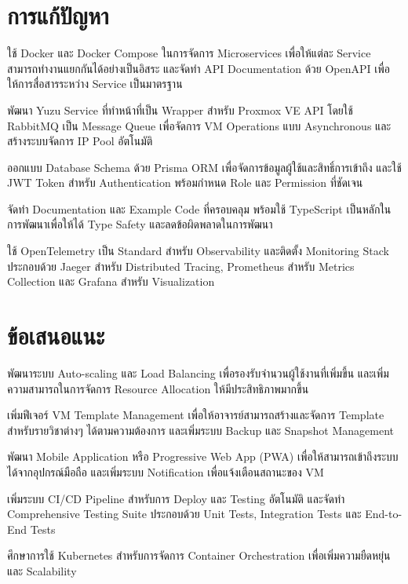 \section{การแก้ปัญหา}
\begin{mycustomenum}[label=5.3.\arabic*] 
    \item ใช้ Docker และ Docker Compose ในการจัดการ Microservices เพื่อให้แต่ละ Service สามารถทำงานแยกกันได้อย่างเป็นอิสระ และจัดทำ API Documentation ด้วย OpenAPI เพื่อให้การสื่อสารระหว่าง Service เป็นมาตรฐาน
    \item พัฒนา Yuzu Service ที่ทำหน้าที่เป็น Wrapper สำหรับ Proxmox VE API โดยใช้ RabbitMQ เป็น Message Queue เพื่อจัดการ VM Operations แบบ Asynchronous และสร้างระบบจัดการ IP Pool อัตโนมัติ
    \item ออกแบบ Database Schema ด้วย Prisma ORM เพื่อจัดการข้อมูลผู้ใช้และสิทธิ์การเข้าถึง และใช้ JWT Token สำหรับ Authentication พร้อมกำหนด Role และ Permission ที่ชัดเจน
    \item จัดทำ Documentation และ Example Code ที่ครอบคลุม พร้อมใช้ TypeScript เป็นหลักในการพัฒนาเพื่อให้ได้ Type Safety และลดข้อผิดพลาดในการพัฒนา
    \item ใช้ OpenTelemetry เป็น Standard สำหรับ Observability และติดตั้ง Monitoring Stack ประกอบด้วย Jaeger สำหรับ Distributed Tracing, Prometheus สำหรับ Metrics Collection และ Grafana สำหรับ Visualization
\end{mycustomenum}

\section{ข้อเสนอแนะ}
\begin{mycustomenum}[label=5.4.\arabic*] 
    \item พัฒนาระบบ Auto-scaling และ Load Balancing เพื่อรองรับจำนวนผู้ใช้งานที่เพิ่มขึ้น และเพิ่มความสามารถในการจัดการ Resource Allocation ให้มีประสิทธิภาพมากขึ้น
    \item เพิ่มฟีเจอร์ VM Template Management เพื่อให้อาจารย์สามารถสร้างและจัดการ Template สำหรับรายวิชาต่างๆ ได้ตามความต้องการ และเพิ่มระบบ Backup และ Snapshot Management
    \item พัฒนา Mobile Application หรือ Progressive Web App (PWA) เพื่อให้สามารถเข้าถึงระบบได้จากอุปกรณ์มือถือ และเพิ่มระบบ Notification เพื่อแจ้งเตือนสถานะของ VM
    \item เพิ่มระบบ CI/CD Pipeline สำหรับการ Deploy และ Testing อัตโนมัติ และจัดทำ Comprehensive Testing Suite ประกอบด้วย Unit Tests, Integration Tests และ End-to-End Tests
    \item ศึกษาการใช้ Kubernetes สำหรับการจัดการ Container Orchestration เพื่อเพิ่มความยืดหยุ่นและ Scalability
\end{mycustomenum}